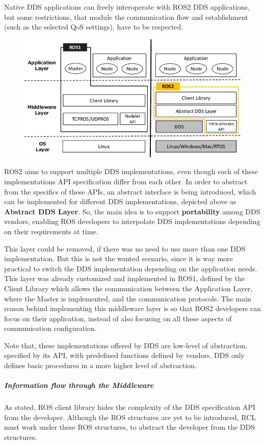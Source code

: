 Native DDS applications can freely interoperate with ROS2 DDS applications, but some restrictions, that module the communication flow and establishment (such as the selected QoS settings), have to be respected.
                
\begin{figure}[H]
    \centering
     \includegraphics[width=0.5\linewidth]{images/ROS2-architecture.png}
\end{figure}

ROS2 aims to support multiple DDS implementations, even though each of these implementations API specification differ from each other. In order to abstract from the specifics of these APIs, an abstract interface is being introduced, which can be implemented for different DDS implementations, depicted above as \textbf{Abstract DDS Layer}. So, the main idea is to support \textbf{portability} among DDS vendors, enabling ROS developers to interpolate DDS implementations depending on their requirements at time.

This layer could be removed, if there was no need to use more than one DDS implementation. But this is not the wanted scenario, since it is way more practical to switch the DDS implementation depending on the application needs. 
This layer was already customized and implemented in ROS1, defined by the Client Library which allows the communication between the Application Layer, where the Master is implemented, and the communication protocols. The main reason behind implementing this middleware layer is so that ROS2 developers can focus on their application, instead of also focusing on all these aspects of communication configuration. 

Note that, these implementations offered by DDS are low-level of abstraction, specified by its API, with predefined functions defined by vendors. DDS only defines basic procedures in a more higher level of abstraction.


\subparagraph{Information flow through the Middleware}

As stated, ROS client library hides the complexity of the DDS specification API from the developer. Although the ROS structures are yet to be introduced, RCL must work under these ROS structures, to abstract the developer from the DDS structures. 
                    
